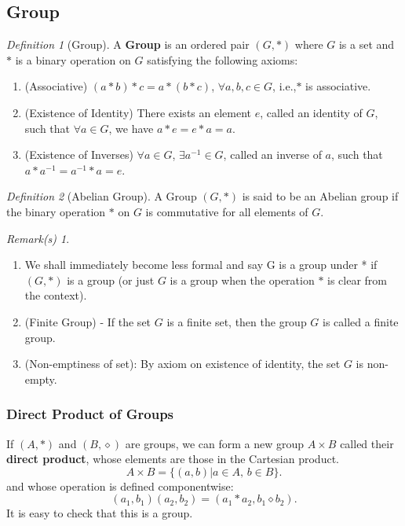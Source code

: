 \documentclass[11pt]{article}
\theoremstyle{plain}%
\theoremstyle{definition}
\theoremstyle{remark}
\theoremstyle{breakthm}
\theoremstyle{breakdefn}
\newtheorem{defn}{Definition}[section]
\theoremstyle{breakrem}
\newtheorem*{rem}{Remark(s)}
\begin{document}
	\subsection{Group}
	\begin{defn}[Group]
		A \textbf{Group} is an ordered pair $(G,*)$ where $G$ is a set and $*$ is a binary operation on $G$ satisfying the following axioms:
		\begin{enumerate}
			\item (Associative) $(a*b)*c=a*(b*c)$, $\forall a,b,c\in G$, i.e.,$*$ is associative.
			\item (Existence of Identity) There exists an element $e$, called an identity of $G$, such that $\forall a\in G$, we have $a*e=e*a=a$.
			\item (Existence of Inverses) $\forall a\in G$, $\exists a^{-1}\in G$, called an inverse of $a$, such that $a*a^{-1}=a^{-1}*a=e$. 
		\end{enumerate}
	\end{defn}
	
	\begin{defn}[Abelian Group]
			A Group $(G,*)$ is said to be an Abelian group if the binary operation $*$ on $G$ is commutative for all elements of $G$.
	\end{defn}
	\begin{rem}
		\leavevmode \vspace{-\baselineskip}
		\begin{enumerate}
			\item We shall immediately become less formal and say G is a group under * if $(G,*)$ is a group (or just $G$ is a group when the operation $*$ is clear from the context).
			\item (Finite Group) - If the set $G$ is a finite set, then the group $G$ is called a finite group.
			\item (Non-emptiness of set): By axiom on existence of identity, the set $G$ is non-empty.
		\end{enumerate}
	\end{rem}
	\subsubsection*{Direct Product of Groups}
	If $(A,*)$ and $(B,\diamond )$ are groups, we can form a new group $A\times B$ called their \textbf{direct product}, whose elements are those in the Cartesian product.
	\[
		A\times B = \{(a,b)|a\in A,\, b\in B\}
	.\] 
	and whose operation is defined componentwise: 
	\[
		(a_{1},b_{1})(a_{2},b_{2}) = (a_{1}*a_{2},b_{1}\diamond b_{2})
	.\]
	It is easy to check that this is a group.
\end{document}
